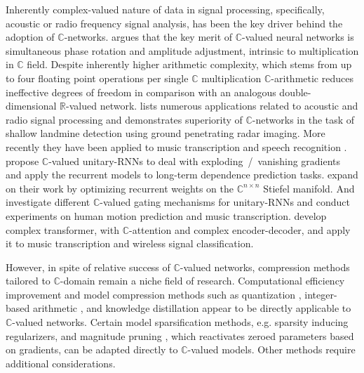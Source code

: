 \documentclass[a4paper,10pt]{article}
\newcommand{\real}{\mathbb{R}}
\newcommand{\cplx}{\mathbb{C}}
\begin{document}
Inherently complex-valued nature of data in signal processing, specifically, acoustic or radio
frequency signal analysis, has been the key driver behind the adoption of $\cplx$-networks.
%
\citet{hirose_complex-valued_2009} argues that the key merit of $\cplx$-valued neural
networks is simultaneous phase rotation and amplitude adjustment, intrinsic to multiplication
in $\cplx$ field. Despite inherently higher arithmetic complexity, which stems from up to four
floating point operations per single $\cplx$ multiplication \citep{monning_evaluation_2018}
$\cplx$-arithmetic reduces ineffective degrees of freedom in comparison with an analogous
double-dimensional $\real$-valued network. \citet{hirose_complex-valued_2009} lists numerous
applications related to acoustic and radio signal processing and demonstrates superiority of
$\cplx$-networks in the task of shallow landmine detection using ground penetrating radar
imaging. More recently they have been applied to music transcription and speech recognition
\citep{trabelsi_deep_2017}. \citet{arjovsky_unitary_2016} propose $\cplx$-valued unitary-RNNs
to deal with exploding~/~vanishing gradients and apply the recurrent models to long-term
dependence prediction tasks. \citet{wisdom_full-capacity_2016} expand on their work by optimizing
recurrent weights on the $\cplx^{n \times n}$ Stiefel manifold. And \citet{wolter_complex_2018}
investigate different $\cplx$-valued gating mechanisms for unitary-RNNs and conduct experiments
on human motion prediction and music transcription. \citet{yang_complex_2019} develop complex
transformer, with $\cplx$-attention and complex encoder-decoder, and apply it to music
transcription and wireless signal classification.


However, in spite of relative success of $\cplx$-valued networks, compression methods tailored
to $\cplx$-domain remain a niche field of research.
%
Computational efficiency improvement and model compression methods such as quantization
\citep{uhlich_differentiable_2019}, integer-based arithmetic \citep{lin_fixed_2016,chen_fxpnet_2017},
and knowledge distillation \citep{hinton_distilling_2015} appear to be directly applicable
to $\cplx$-valued networks.
%
Certain model sparsification methods, e.g. sparsity inducing regularizers, and magnitude
pruning \citep{zuo_compression_2019}, which reactivates zeroed parameters based on gradients,
can be adapted directly to $\cplx$-valued models. Other methods require additional considerations.
\end{document}
